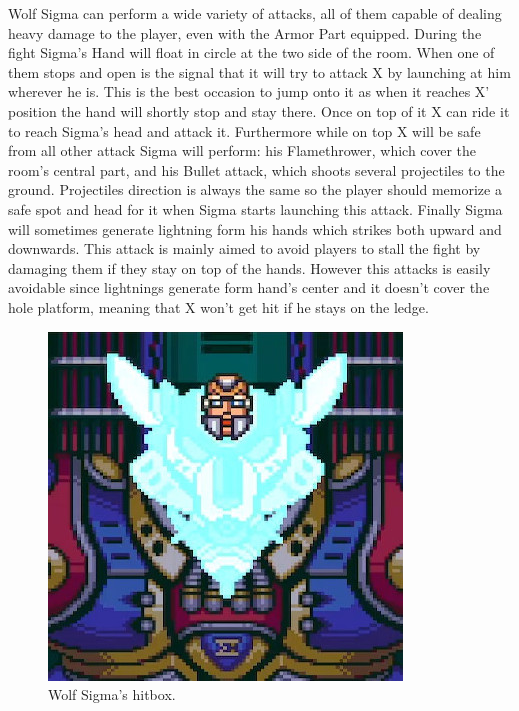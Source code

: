 Wolf Sigma can perform a wide variety of attacks, all of them capable of dealing heavy damage to the player, even with the Armor Part equipped. During the fight Sigma's Hand will float in circle at the two side of the room. When one of them stops and open is the signal that it will try to attack X by launching at him wherever he is. This is the best occasion to jump onto it as when it reaches X' position the hand will shortly stop and stay there. Once on top of it X can ride it to reach Sigma's head and attack it. Furthermore while on top X will be safe from all other attack Sigma will perform: his Flamethrower, which cover the room's central part, and his Bullet attack, which shoots several projectiles to the ground. Projectiles direction is always the same so the player should memorize a safe spot and head for it when Sigma starts launching this attack. Finally Sigma will sometimes generate lightning form his hands which strikes both upward and downwards. This attack is mainly aimed to avoid players to stall the fight by damaging them if they stay on top of the hands. However this attacks is easily avoidable since lightnings generate form hand's center and it doesn't cover the hole platform, meaning that X won't get hit if he stays on the ledge. 
\begin{figure}[htp]
	\centering		
	\includegraphics[width=0.4\linewidth]{figures/X1/Sigma_stages/WolfSigma_hitbox.jpg}
	\caption{Wolf Sigma's hitbox.}
\end{figure}

